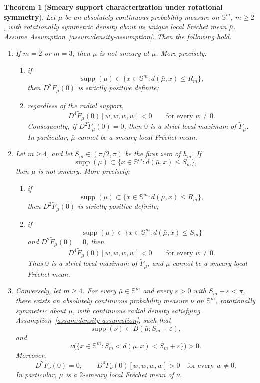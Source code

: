 \documentclass{amsart}
\newtheorem{theorem}{Theorem}[section]
\theoremstyle{definition}
\theoremstyle{remark}
\newcommand{\mubar}{\bar{\mu}}
\newcommand\0{\boldsymbol{0}}
\begin{document}
\begin{theorem}[\textbf{Smeary support characterization under rotational symmetry}]
\label{thm:semi-tight-support-rot-symm}
\label{thm:ball-obstruction-rot-symm}
\label{thm:engineering-density-in-thin-annuli}
Let \(\mu\) be an absolutely continuous probability measure on \(\mathbb S^m\), \(m\ge2\), with rotationally symmetric density about its unique local Fréchet mean \(\mubar\). Assume Assumption~\ref{assum:density-assumption}. Then the following hold.

\begin{enumerate}
\item[(i)] If \(m=2\) or \(m=3\), then \(\mu\) is not smeary at $\mubar$. More precisely:
\begin{enumerate}
\item[(a)] if
\[
\operatorname{supp}(\mu)\subset \{x\in \mathbb S^m:d(\mubar,x)\le R_m\},
\]
then \(D^2\widetilde F_\mu(0)\) is strictly positive definite;

\item[(b)] regardless of the radial support,
\[
D^4\widetilde F_\mu(0)[w,w,w,w]<0
\qquad\text{for every }w\neq0.
\]
Consequently, if \(D^2\widetilde F_\mu(0)=0\), then \(0\) is a strict local maximum of \(\widetilde F_\mu\). In particular, \(\mubar\) cannot be a smeary local Fréchet mean.
\end{enumerate}

\item[(ii)] Let \(m\ge4\), and let \(S_m\in(\pi/2,\pi)\) be the first zero of \(h_m\). If
\[
\operatorname{supp}(\mu)\subset \{x\in \mathbb S^m:d(\mubar,x)\le S_m\},
\]
then \(\mu\) is not smeary. More precisely:
\begin{enumerate}
\item[(a)] if
\[
\operatorname{supp}(\mu)\subset \{x\in \mathbb S^m:d(\mubar,x)\le R_m\},
\]
then \(D^2\widetilde F_\mu(0)\) is strictly positive definite;

\item[(b)] if
\[
\operatorname{supp}(\mu)\subset \{x\in \mathbb S^m:d(\mubar,x)\le S_m\}
\]
and \(D^2\widetilde F_\mu(0)=0\), then
\[
D^4\widetilde F_\mu(0)[w,w,w,w]<0
\qquad\text{for every }w\neq0.
\]
Thus \(0\) is a strict local maximum of \(\widetilde F_\mu\), and \(\mubar\) cannot be a smeary local Fréchet mean.
\end{enumerate}

\item[(iii)] Conversely, let \(m\ge4\). For every \(\mubar\in\mathbb S^m\) and every \(\varepsilon>0\) with \(S_m+\varepsilon<\pi\), there exists an absolutely continuous probability measure \(\nu\) on \(\mathbb S^m\), rotationally symmetric about \(\mubar\), with continuous radial density satisfying Assumption~\ref{assum:density-assumption}, such that
\[
\operatorname{supp}(\nu)\subset B(\mubar;S_m+\varepsilon),
\]
and
\[
\nu\bigl(\{x\in\mathbb S^m:S_m<d(\mubar,x)<S_m+\varepsilon\}\bigr)>0.
\]
Moreover,
\[
D^2\widetilde F_\nu(0)=0,
\qquad
D^4\widetilde F_\nu(0)[w,w,w,w]>0
\quad\text{for every }w\neq0.
\]
In particular, \(\mubar\) is a \(2\)-smeary local Fréchet mean of \(\nu\).


\end{enumerate}
\end{theorem}
\end{document}
